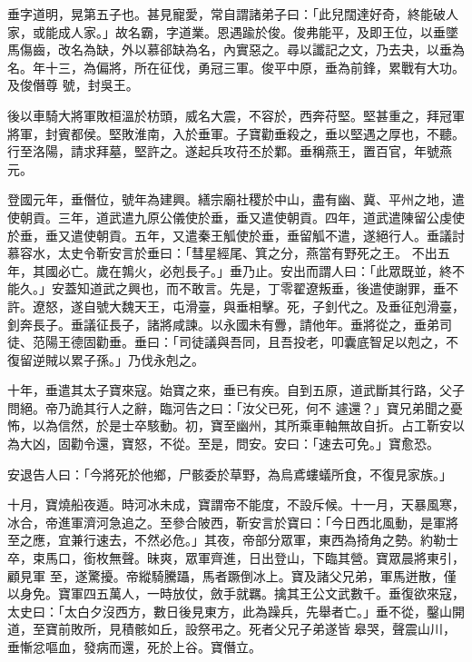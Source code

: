 \begin{pinyinscope}
 垂字道明，晃第五子也。甚見寵愛，常自謂諸弟子曰：「此兒闊達好奇，終能破人家，或能成人家。」故名霸，字道業。恩遇踰於俊。俊弗能平，及即王位，以垂墜馬傷齒，改名為缺，外以慕郤缺為名，內實惡之。尋以讖記之文，乃去夬，以垂為名。年十三，為偏將，所在征伐，勇冠三軍。俊平中原，垂為前鋒，累戰有大功。及俊僭尊
 號，封吳王。



 後以車騎大將軍敗桓溫於枋頭，威名大震，不容於，西奔苻堅。堅甚重之，拜冠軍將軍，封賓都侯。堅敗淮南，入於垂軍。子寶勸垂殺之，垂以堅遇之厚也，不聽。行至洛陽，請求拜墓，堅許之。遂起兵攻苻丕於鄴。垂稱燕王，置百官，年號燕元。



 登國元年，垂僭位，號年為建興。繕宗廟社稷於中山，盡有幽、冀、平州之地，遣使朝貢。三年，道武遣九原公儀使於垂，垂又遣使朝貢。四年，道武遣陳留公虔使於垂，垂又遣使朝貢。五年，又遣秦王觚使於垂，垂留觚不遣，遂絕行人。垂議討慕容水，太史令靳安言於垂曰：「彗星經尾、箕之分，燕當有野死之王。
 不出五年，其國必亡。歲在鶉火，必剋長子。」垂乃止。安出而謂人曰：「此眾既並，終不能久。」安蓋知道武之興也，而不敢言。先是，丁零翟遼叛垂，後遣使謝罪，垂不許。遼怒，遂自號大魏天王，屯滑臺，與垂相擊。死，子釗代之。及垂征剋滑臺，釗奔長子。垂議征長子，諸將咸諫。以永國未有釁，請他年。垂將從之，垂弟司徒、范陽王德固勸垂。垂曰：「司徒議與吾同，且吾投老，叩囊底智足以剋之，不復留逆賊以累子孫。」乃伐永剋之。



 十年，垂遣其太子寶來寇。始寶之來，垂已有疾。自到五原，道武斷其行路，父子問絕。帝乃詭其行人之辭，臨河告之曰：「汝父已死，何不
 遽還？」寶兄弟聞之憂怖，以為信然，於是士卒駭動。初，寶至幽州，其所乘車軸無故自折。占工靳安以為大凶，固勸令還，寶怒，不從。至是，問安。安曰：「速去可免。」寶愈恐。



 安退告人曰：「今將死於他鄉，尸骸委於草野，為烏鳶螻蟻所食，不復見家族。」



 十月，寶燒船夜遁。時河冰未成，寶謂帝不能度，不設斥候。十一月，天暴風寒，冰合，帝進軍濟河急追之。至參合陂西，靳安言於寶曰：「今日西北風動，是軍將至之應，宜兼行速去，不然必危。」其夜，帝部分眾軍，東西為掎角之勢。約勒士卒，束馬口，銜枚無聲。昧爽，眾軍齊進，日出登山，下臨其營。寶眾晨將東引，顧見軍
 至，遂驚擾。帝縱騎騰躡，馬者蹶倒冰上。寶及諸父兄弟，軍馬迸散，僅以身免。寶軍四五萬人，一時放仗，斂手就羈。擒其王公文武數千。垂復欲來寇，太史曰：「太白夕沒西方，數日後見東方，此為躁兵，先舉者亡。」垂不從，鑿山開道，至寶前敗所，見積骸如丘，設祭弔之。死者父兄子弟遂皆皋哭，聲震山川，垂慚忿嘔血，發病而還，死於上谷。寶僭立。




\end{pinyinscope}
